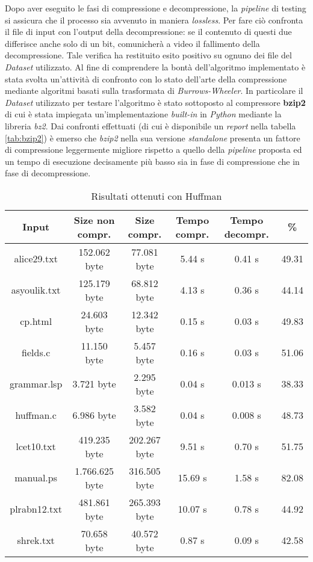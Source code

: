 Dopo aver eseguito le fasi di compressione e decompressione, la \emph{pipeline} di testing si assicura che il processo sia avvenuto in maniera \emph{lossless}. Per fare ciò confronta il file di input con l'output della decompressione: se il contenuto di questi due differisce anche solo di un bit, comunicherà a video il fallimento della decompressione. Tale verifica ha restituito esito positivo su ognuno dei file del \emph{Dataset} utilizzato. Al fine di comprendere la bontà dell'algoritmo implementato è stata svolta un'attività di confronto con lo stato dell'arte della compressione mediante algoritmi basati sulla trasformata di \emph{Burrows-Wheeler}. In particolare il \emph{Dataset} utilizzato per testare l'algoritmo è stato sottoposto al compressore \textbf{bzip2} di cui è stata impiegata un'implementazione \emph{built-in} in \emph{Python} mediante la libreria \emph{bz2}. Dai confronti effettuati (di cui è disponibile un \emph{report} nella tabella \ref{tab:bzip2}) è emerso che \emph{bzip2} nella sua versione \emph{standalone} presenta un fattore di compressione leggermente migliore rispetto a quello della \emph{pipeline} proposta ed un tempo di esecuzione decisamente più basso sia in fase di compressione che in fase di decompressione.
    \begin{table}
    \begin{tabular}{||c c c c c c||} 
     \hline
     Input & Size non compr. & Size compr. & Tempo compr. & Tempo decompr. & \% \\ [0.5ex] 
     \hline\hline
     alice29.txt & 152.062 byte & 77.081 byte & 5.44 s & 0.41 s & 49.31\\ [1ex]
     \hline
     asyoulik.txt & 125.179 byte & 68.812 byte & 4.13 s & 0.36 s & 44.14\\ [1ex] 
     \hline
     cp.html & 24.603 byte & 12.342 byte & 0.15 s & 0.03 s & 49.83\\ [1ex] 
     \hline
     fields.c & 11.150 byte & 5.457 byte & 0.16 s & 0.03 s & 51.06\\ [1ex]
     \hline
     grammar.lsp & 3.721 byte & 2.295 byte & 0.04 s & 0.013 s & 38.33\\ [1ex] 
     \hline
     huffman.c & 6.986 byte & 3.582 byte & 0.04 s & 0.008 s & 48.73\\ [1ex]
     \hline
     lcet10.txt & 419.235 byte & 202.267 byte & 9.51 s & 0.70 s & 51.75\\ [1ex] 
     \hline
     manual.ps & 1.766.625 byte & 316.505 byte & 15.69 s & 1.58 s & 82.08\\ 
 [1ex]
     \hline
     plrabn12.txt & 481.861 byte & 265.393 byte & 10.07 s & 0.78 s & 44.92\\ [1ex] 
     \hline
     shrek.txt & 70.658 byte & 40.572 byte & 0.87 s & 0.09 s & 42.58\\ [1ex]

     \hline
    \end{tabular} 
    \caption{Risultati ottenuti con Huffman\label{tab:huffman}}
    \end{table}
